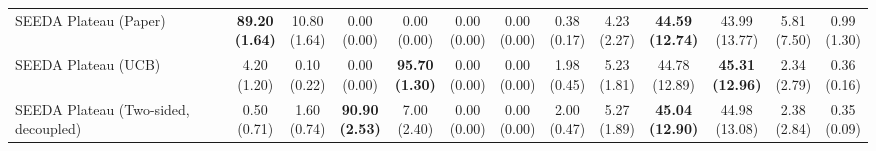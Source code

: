 \begin{table}[H]
{\begin{tabular}{l|cccccc|cccccc}
SEEDA Plateau (Paper) & \bfseries \makecell{89.20 \\ (1.64)} & \makecell{10.80 \\ (1.64)} & {\cellcolor[HTML]{C8E6C9}} \makecell{0.00 \\ (0.00)} & \makecell{0.00 \\ (0.00)} & \makecell{0.00 \\ (0.00)} & \makecell{0.00 \\ (0.00)} & \makecell{0.38 \\ (0.17)} & \makecell{4.23 \\ (2.27)} & {\cellcolor[HTML]{C8E6C9}} \bfseries \makecell{44.59 \\ (12.74)} & \makecell{43.99 \\ (13.77)} & \makecell{5.81 \\ (7.50)} & \makecell{0.99 \\ (1.30)} \\
SEEDA Plateau (UCB) & \makecell{4.20 \\ (1.20)} & \makecell{0.10 \\ (0.22)} & {\cellcolor[HTML]{C8E6C9}} \makecell{0.00 \\ (0.00)} & \bfseries \makecell{95.70 \\ (1.30)} & \makecell{0.00 \\ (0.00)} & \makecell{0.00 \\ (0.00)} & \makecell{1.98 \\ (0.45)} & \makecell{5.23 \\ (1.81)} & {\cellcolor[HTML]{C8E6C9}} \makecell{44.78 \\ (12.89)} & \bfseries \makecell{45.31 \\ (12.96)} & \makecell{2.34 \\ (2.79)} & \makecell{0.36 \\ (0.16)} \\
SEEDA Plateau (Two-sided, decoupled) & \makecell{0.50 \\ (0.71)} & \makecell{1.60 \\ (0.74)} & {\cellcolor[HTML]{C8E6C9}} \bfseries \makecell{90.90 \\ (2.53)} & \makecell{7.00 \\ (2.40)} & \makecell{0.00 \\ (0.00)} & \makecell{0.00 \\ (0.00)} & \makecell{2.00 \\ (0.47)} & \makecell{5.27 \\ (1.89)} & {\cellcolor[HTML]{C8E6C9}} \bfseries \makecell{45.04 \\ (12.90)} & \makecell{44.98 \\ (13.08)} & \makecell{2.38 \\ (2.84)} & \makecell{0.35 \\ (0.09)} \\

\end{tabular}}
\end{table}
